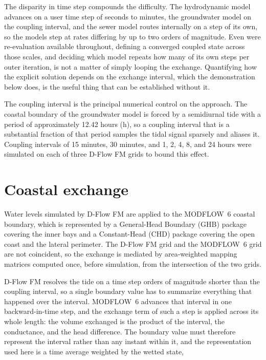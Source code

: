 \documentclass[preprint,authoryear,11pt]{elsarticle}
\begin{document}
The disparity in time step compounds the difficulty. The hydrodynamic model advances on a user time step of seconds to minutes, the groundwater model on the coupling interval, and the sewer model routes internally on a step of its own, so the models step at rates differing by up to two orders of magnitude. Even were re-evaluation available throughout, defining a converged coupled state across those scales, and deciding which model repeats how many of its own steps per outer iteration, is not a matter of simply looping the exchange. Quantifying how the explicit solution depends on the exchange interval, which the demonstration below does, is the useful thing that can be established without it.

The coupling interval is the principal numerical control on the approach. The coastal boundary of the groundwater model is forced by a semidiurnal tide with a period of approximately 12.42 hours (\si{\hour}), so a coupling interval that is a substantial fraction of that period samples the tidal signal sparsely and aliases it. Coupling intervals of 15 minutes, 30 minutes, and 1, 2, 4, 8, and 24 hours were simulated on each of three D-Flow FM grids to bound this effect.

\section{Coastal exchange}

Water levels simulated by D-Flow FM are applied to the MODFLOW~6 coastal boundary, which is represented by a General-Head Boundary (GHB) package covering the inner bays and a Constant-Head (CHD) package covering the open coast and the lateral perimeter. The D-Flow FM grid and the MODFLOW~6 grid are not coincident, so the exchange is mediated by area-weighted mapping matrices computed once, before simulation, from the intersection of the two grids.

D-Flow FM resolves the tide on a time step orders of magnitude shorter than the coupling interval, so a single boundary value has to summarize everything that happened over the interval. MODFLOW~6 advances that interval in one backward-in-time step, and the exchange term of such a step is applied across its whole length: the volume exchanged is the product of the interval, the conductance, and the head difference. The boundary value must therefore represent the interval rather than any instant within it, and the representation used here is a time average weighted by the wetted state,
\end{document}
